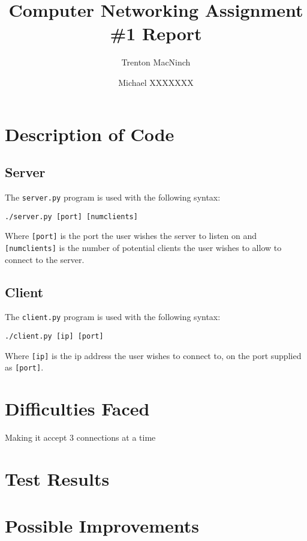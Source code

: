 \documentclass{article}
\title{Computer Networking Assignment \#1 Report}
\author{Trenton MacNinch \and Michael XXXXXXX}
\begin{document}
\maketitle

\section{Description of Code}
\subsection{Server}
The \texttt{server.py} program is used with the following syntax:

\texttt{./server.py [port] [numclients]}

Where \texttt{[port]} is the port the user wishes the server to listen on and \texttt{[numclients]} is the number of potential clients the user wishes to allow to connect to the server.

\subsection{Client}
The \texttt{client.py} program is used with the following syntax:

\texttt{./client.py [ip] [port]}

Where \texttt{[ip]} is the ip address the user wishes to connect to, on the port supplied as \texttt{[port]}.


\section{Difficulties Faced}
Making it accept 3 connections at a time

\section{Test Results}

\section{Possible Improvements}
\end{document}
